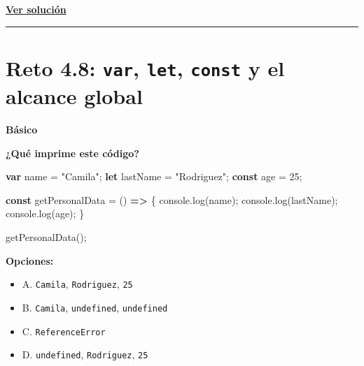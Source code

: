 \documentclass[
  letterpaper,
  DIV=11,
  numbers=noendperiod]{scrreprt}
\newenvironment{Shaded}{\begin{snugshade}}{\end{snugshade}}
\newcommand{\BuiltInTok}[1]{\textcolor[rgb]{0.00,0.23,0.31}{#1}}
\newcommand{\DecValTok}[1]{\textcolor[rgb]{0.68,0.00,0.00}{#1}}
\newcommand{\FunctionTok}[1]{\textcolor[rgb]{0.28,0.35,0.67}{#1}}
\newcommand{\KeywordTok}[1]{\textcolor[rgb]{0.00,0.23,0.31}{\textbf{#1}}}
\newcommand{\NormalTok}[1]{\textcolor[rgb]{0.00,0.23,0.31}{#1}}
\newcommand{\OperatorTok}[1]{\textcolor[rgb]{0.37,0.37,0.37}{#1}}
\newcommand{\StringTok}[1]{\textcolor[rgb]{0.13,0.47,0.30}{#1}}
\providecommand{\tightlist}{%
  \setlength{\itemsep}{0pt}\setlength{\parskip}{0pt}}
\begin{document}
\textbf{\hyperref[sec-sol-cap4-reto7]{Ver solución}}

\begin{center}\rule{0.5\linewidth}{0.5pt}\end{center}

\section{\texorpdfstring{Reto 4.8: \texttt{var}, \texttt{let},
\texttt{const} y el alcance
global}{Reto 4.8: var, let, const y el alcance global}}\label{sec-cap4-reto8}

\begin{tcolorbox}[enhanced jigsaw, left=2mm, toprule=.15mm, leftrule=.75mm, breakable, colback=white, coltitle=black, bottomtitle=1mm, arc=.35mm, rightrule=.15mm, colframe=quarto-callout-caution-color-frame, opacitybacktitle=0.6, toptitle=1mm, opacityback=0, titlerule=0mm, title=\textcolor{quarto-callout-caution-color}{\faFire}\hspace{0.5em}{Dificultad}, bottomrule=.15mm, colbacktitle=quarto-callout-caution-color!10!white]

\textbf{Básico}

\end{tcolorbox}

\textbf{¿Qué imprime este código?}

\begin{Shaded}
\begin{Highlighting}[]
\KeywordTok{var}\NormalTok{ name }\OperatorTok{=} \StringTok{"Camila"}\OperatorTok{;}
\KeywordTok{let}\NormalTok{ lastName }\OperatorTok{=} \StringTok{"Rodriguez"}\OperatorTok{;}
\KeywordTok{const}\NormalTok{ age }\OperatorTok{=} \DecValTok{25}\OperatorTok{;}

\KeywordTok{const}\NormalTok{ getPersonalData }\OperatorTok{=}\NormalTok{ () }\KeywordTok{=\textgreater{}}\NormalTok{ \{}
  \BuiltInTok{console}\OperatorTok{.}\FunctionTok{log}\NormalTok{(name)}\OperatorTok{;}
  \BuiltInTok{console}\OperatorTok{.}\FunctionTok{log}\NormalTok{(lastName)}\OperatorTok{;}
  \BuiltInTok{console}\OperatorTok{.}\FunctionTok{log}\NormalTok{(age)}\OperatorTok{;}
\NormalTok{\}}

\FunctionTok{getPersonalData}\NormalTok{()}\OperatorTok{;}
\end{Highlighting}
\end{Shaded}

\textbf{Opciones:}

\begin{itemize}
\tightlist
\item
  A. \texttt{Camila}, \texttt{Rodriguez}, \texttt{25}
\item
  B. \texttt{Camila}, \texttt{undefined}, \texttt{undefined}
\item
  C. \texttt{ReferenceError}
\item
  D. \texttt{undefined}, \texttt{Rodriguez}, \texttt{25}
\end{itemize}
\end{document}
